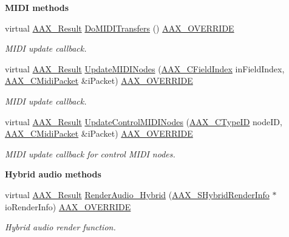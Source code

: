 \begin{Indent}{\bf M\+I\+D\+I methods}\par
\begin{DoxyCompactItemize}
\item 
virtual \hyperlink{a00149_a4d8f69a697df7f70c3a8e9b8ee130d2f}{A\+A\+X\+\_\+\+Result} \hyperlink{a00018_ae5c1dca13e08cedbbcaca50767dc19e8}{Do\+M\+I\+D\+I\+Transfers} () \hyperlink{a00149_ac2f24a5172689ae684344abdcce55463}{A\+A\+X\+\_\+\+O\+V\+E\+R\+R\+I\+D\+E}
\begin{DoxyCompactList}\small\item\em M\+I\+D\+I update callback. \end{DoxyCompactList}\item 
virtual \hyperlink{a00149_a4d8f69a697df7f70c3a8e9b8ee130d2f}{A\+A\+X\+\_\+\+Result} \hyperlink{a00018_a900a8fcf7d2e0bebda33e5ac393019c2}{Update\+M\+I\+D\+I\+Nodes} (\hyperlink{a00149_ae807f8986143820cfb5d6da32165c9c7}{A\+A\+X\+\_\+\+C\+Field\+Index} in\+Field\+Index, \hyperlink{a00024}{A\+A\+X\+\_\+\+C\+Midi\+Packet} \&i\+Packet) \hyperlink{a00149_ac2f24a5172689ae684344abdcce55463}{A\+A\+X\+\_\+\+O\+V\+E\+R\+R\+I\+D\+E}
\begin{DoxyCompactList}\small\item\em M\+I\+D\+I update callback. \end{DoxyCompactList}\item 
virtual \hyperlink{a00149_a4d8f69a697df7f70c3a8e9b8ee130d2f}{A\+A\+X\+\_\+\+Result} \hyperlink{a00018_aeaaaad6ff1a84c8fc66dcdfd8bc430c5}{Update\+Control\+M\+I\+D\+I\+Nodes} (\hyperlink{a00149_ac678f9c1fbcc26315d209f71a147a175}{A\+A\+X\+\_\+\+C\+Type\+I\+D} node\+I\+D, \hyperlink{a00024}{A\+A\+X\+\_\+\+C\+Midi\+Packet} \&i\+Packet) \hyperlink{a00149_ac2f24a5172689ae684344abdcce55463}{A\+A\+X\+\_\+\+O\+V\+E\+R\+R\+I\+D\+E}
\begin{DoxyCompactList}\small\item\em M\+I\+D\+I update callback for control M\+I\+D\+I nodes. \end{DoxyCompactList}\end{DoxyCompactItemize}
\end{Indent}
\begin{Indent}{\bf Hybrid audio methods}\par
\begin{DoxyCompactItemize}
\item 
virtual \hyperlink{a00149_a4d8f69a697df7f70c3a8e9b8ee130d2f}{A\+A\+X\+\_\+\+Result} \hyperlink{a00018_a70c1cf315915535cb593860ed42b6cbe}{Render\+Audio\+\_\+\+Hybrid} (\hyperlink{a00121}{A\+A\+X\+\_\+\+S\+Hybrid\+Render\+Info} $\ast$io\+Render\+Info) \hyperlink{a00149_ac2f24a5172689ae684344abdcce55463}{A\+A\+X\+\_\+\+O\+V\+E\+R\+R\+I\+D\+E}
\begin{DoxyCompactList}\small\item\em Hybrid audio render function. \end{DoxyCompactList}\end{DoxyCompactItemize}
\end{Indent}
